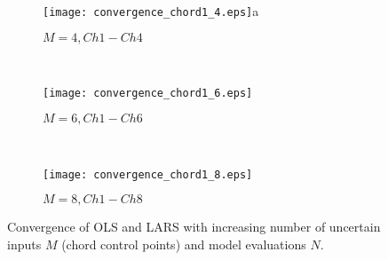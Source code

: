 \begin{figure*}[h!]
    \centering
    \begin{subfigure}[t]{0.32\textwidth}
        \centering
        \texttt{[image: convergence\_chord1\_4.eps]}{a}
        \caption{$M=4, Ch1-Ch4$}
    \end{subfigure}%
    ~ 
    \begin{subfigure}[t]{0.32\textwidth}
        \centering
        \texttt{[image: convergence\_chord1\_6.eps]}
        \caption{$M=6, Ch1-Ch6$}
    \end{subfigure}
      ~ 
    \begin{subfigure}[t]{0.32\textwidth}
        \centering
        \texttt{[image: convergence\_chord1\_8.eps]}
        \caption{ $M=8, Ch1-Ch8$}
 \end{subfigure}
    \caption{Convergence of OLS and LARS with increasing number of uncertain inputs $M$ (chord control points) and model evaluations $N$.}
\label{convergence_dim}
\end{figure*}



